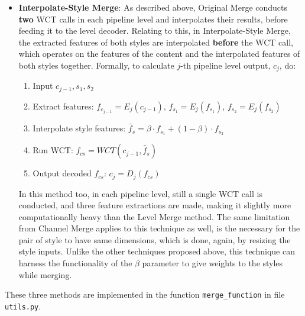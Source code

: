 \begin{itemize}
	\item \textbf{Interpolate-Style Merge}: As described above, Original Merge conducts \textbf{two} WCT calls in each pipeline level and interpolates their results, before feeding it to the level decoder. Relating to this, in Interpolate-Style Merge, the extracted features of both styles are interpolated \textbf{before} the WCT call, which operates on the features of the content and the interpolated features of both styles together. Formally, to calculate $j$-th pipeline level output, $c_j$, do:
	\begin{enumerate}
		\item Input $c_{j-1}, s_1, s_2$
		\item Extract features: $f_{c_{j-1}} = E_j(c_{j-1})$, $f_{s_1} = E_j(f_{s_1})$, $f_{s_2} = E_j(f_{s_2})$
		\item Interpolate style features: $\tilde{f_{s}} = \beta\cdot f_{s_1} + (1-\beta)\cdot f_{s_2}$
		\item Run WCT: $f_{cs} = WCT(c_{j-1}, \tilde{f_{s}})$
		\item Output decoded $f_{cs}$: $c_j = D_j(f_{cs})$
	\end{enumerate}
	In this method too, in each pipeline level, still a single WCT call is conducted, and three feature extractions are made, making it slightly more computationally heavy than the Level Merge method. The same limitation from Channel Merge applies to this technique as well, is the necessary for the pair of style to have same dimensions, which is done, again, by resizing the style inputs. Unlike the other techniques proposed above, this technique can harness the functionality of the $\beta$ parameter to give weights to the styles while merging.
\end{itemize}
These three methods are implemented in the function \texttt{merge\_function} in file \texttt{utils.py}.
